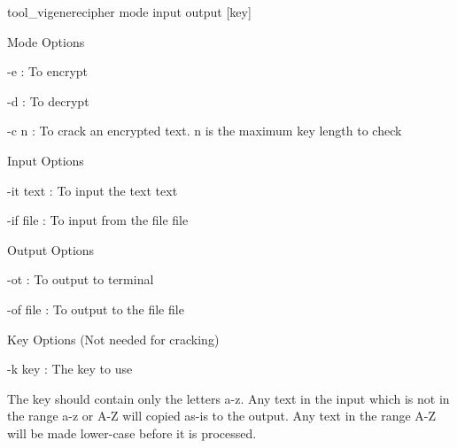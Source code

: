\begin{DoxyVerb}tool_vigenerecipher mode input output [key]
\end{DoxyVerb}
 Mode Options
\begin{DoxyItemize}
\item -\/e \+: To encrypt
\item -\/d \+: To decrypt
\item -\/c n \+: To crack an encrypted text. n is the maximum key length to check
\end{DoxyItemize}

Input Options
\begin{DoxyItemize}
\item -\/it text \+: To input the text \textquotesingle{}text\textquotesingle{}
\item -\/if file \+: To input from the file \textquotesingle{}file\textquotesingle{}
\end{DoxyItemize}

Output Options
\begin{DoxyItemize}
\item -\/ot \+: To output to terminal
\item -\/of file \+: To output to the file \textquotesingle{}file\textquotesingle{}
\end{DoxyItemize}

Key Options (Not needed for cracking)
\begin{DoxyItemize}
\item -\/k key \+: The key to use
\end{DoxyItemize}

The key should contain only the letters a-\/z. Any text in the input which is not in the range a-\/z or A-\/Z will copied as-\/is to the output. Any text in the range A-\/Z will be made lower-\/case before it is processed. 